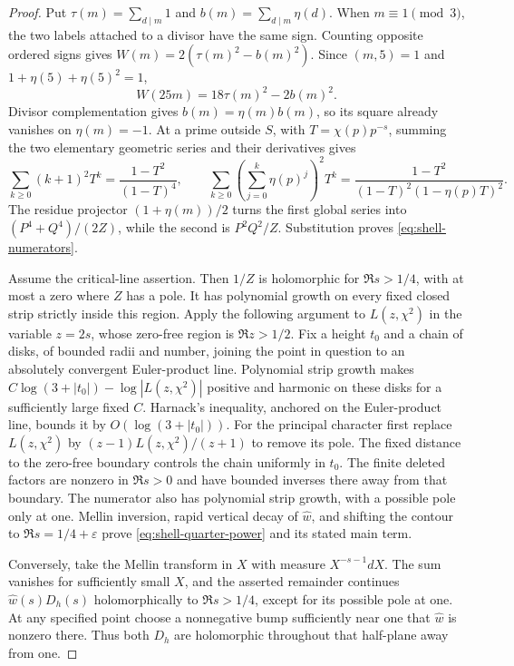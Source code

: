\begin{proof}
Put $\tau(m)=\sum_{d\mid m}1$ and
$b(m)=\sum_{d\mid m}\eta(d)$. When $m\equiv1\pmod3$,
the two labels attached to a divisor have the same sign.
Counting opposite ordered signs gives
$W(m)=2(\tau(m)^2-b(m)^2)$.
Since $(m,5)=1$ and $1+\eta(5)+\eta(5)^2=1$,
\[
 W(25m)=18\tau(m)^2-2b(m)^2.
\]
Divisor complementation gives $b(m)=\eta(m)b(m)$, so its square
already vanishes on $\eta(m)=-1$. At a prime outside $S$, with
$T=\chi(p)p^{-s}$, summing the two elementary geometric series
and their derivatives gives
\[
 \sum_{k\geq0}(k+1)^2T^k=\frac{1-T^2}{(1-T)^4},
 \qquad
 \sum_{k\geq0}\left(\sum_{j=0}^k\eta(p)^j\right)^2T^k
     =\frac{1-T^2}{(1-T)^2(1-\eta(p)T)^2}.
\]
The residue projector $(1+\eta(m))/2$ turns the first global
series into $(P^4+Q^4)/(2Z)$, while the second is $P^2Q^2/Z$.
Substitution proves \eqref{eq:shell-numerators}.

Assume the critical-line assertion. Then $1/Z$ is holomorphic
for $\Re s>1/4$, with at most a zero where $Z$ has a pole.
It has polynomial growth on every fixed closed strip strictly
inside this region. Apply the following argument to $L(z,\chi^2)$
in the variable $z=2s$, whose zero-free region is $\Re z>1/2$.
Fix a height $t_0$ and a chain
of disks, of bounded radii and number, joining the point in
question to an absolutely convergent Euler-product line.
Polynomial strip growth makes
$C\log(3+|t_0|)-\log|L(z,\chi^2)|$ positive and harmonic on
these disks for a sufficiently large fixed $C$. Harnack's
inequality, anchored on the Euler-product line, bounds it by
$O(\log(3+|t_0|))$. For the principal character first replace
$L(z,\chi^2)$ by $(z-1)L(z,\chi^2)/(z+1)$ to remove its pole.
The fixed distance to the zero-free boundary controls the chain
uniformly in $t_0$. The finite deleted factors
are nonzero in $\Re s>0$ and have bounded inverses there away
from that boundary. The numerator also has polynomial strip
growth, with a possible pole only at one. Mellin inversion,
rapid vertical decay of $\widehat w$, and shifting the contour
to $\Re s=1/4+\varepsilon$ prove
\eqref{eq:shell-quarter-power} and its stated main term.

Conversely, take the Mellin transform in $X$ with measure
$X^{-s-1}dX$. The sum vanishes for sufficiently small $X$, and
the asserted remainder continues $\widehat w(s)D_h(s)$
holomorphically to $\Re s>1/4$, except for its possible pole at
one. At any specified point choose a nonnegative bump sufficiently
near one that $\widehat w$ is nonzero there. Thus both $D_h$ are
holomorphic throughout that half-plane away from one.


\end{proof}
